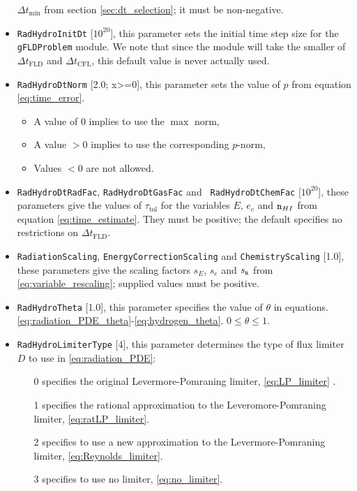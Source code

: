 \documentclass[letterpaper,10pt]{article}
\renewcommand{\(}{\left(}
\renewcommand{\)}{\right)}
\newcommand{\dt}{\Delta t}
\newcommand{\mn}{{\tt n}}
\begin{document}
\begin{itemize}
  $\dt_{\text{min}}$ from section \ref{sec:dt_selection}; it must be
  non-negative.
\item {\tt RadHydroInitDt} [$10^{20}$], this parameter sets the initial
  time step size for the {\tt gFLDProblem} module.  We note that since
  the module will take the smaller of $\dt_{\text{FLD}}$ and
  $\dt_{\text{CFL}}$, this default value is never actually used.
\item {\tt RadHydroDtNorm} [2.0; x>=0], this parameter sets the value
  of $p$ from equation \eqref{eq:time_error}.  
  \begin{itemize}
  \item A value of $0$ implies to use the $\max$ norm, 
  \item A value $>0$ implies to use the corresponding $p$-norm,
  \item Values $<0$ are not allowed.
  \end{itemize}
\item {\tt RadHydroDtRadFac}, {\tt RadHydroDtGasFac} and {\tt
    RadHydroDtChemFac}  [$10^{20}$], these parameters give the values
  of $\tau_{\text{tol}}$ for the variables $E$, $e_c$ and $\mn_{HI}$
  from equation \eqref{eq:time_estimate}.  They must be positive; the
  default specifies no restrictions on $\dt_{\text{FLD}}$.
\item {\tt RadiationScaling}, {\tt EnergyCorrectionScaling} and 
  {\tt ChemistryScaling} [1.0], these parameters give the scaling 
  factors $s_E$, $s_e$ and $s_{\mn}$ from
  \eqref{eq:variable_rescaling}; supplied values must be positive.
\item {\tt RadHydroTheta} [1.0], this parameter specifies the
  value of $\theta$ in equations.
  \eqref{eq:radiation_PDE_theta}-\eqref{eq:hydrogen_theta}.
  $0\le\theta\le 1$.
\item {\tt RadHydroLimiterType} [4], this parameter determines the
  type of flux limiter $D$ to use in \eqref{eq:radiation_PDE}:
  \begin{itemize}
  \item[0] specifies the original Levermore-Pomraning limiter,
    \eqref{eq:LP_limiter} \cite{LevermorePomraning1981,Levermore1984}.
  \item[1] specifies the rational approximation to the
    Leveromore-Pomraning limiter, \eqref{eq:ratLP_limiter}.
  \item[2] specifies to use a new approximation to the
    Levermore-Pomraning limiter, \eqref{eq:Reynolds_limiter}.
  \item[3] specifies to use no limiter, \eqref{eq:no_limiter}.

\end{itemize}
\end{itemize}
\end{document}
